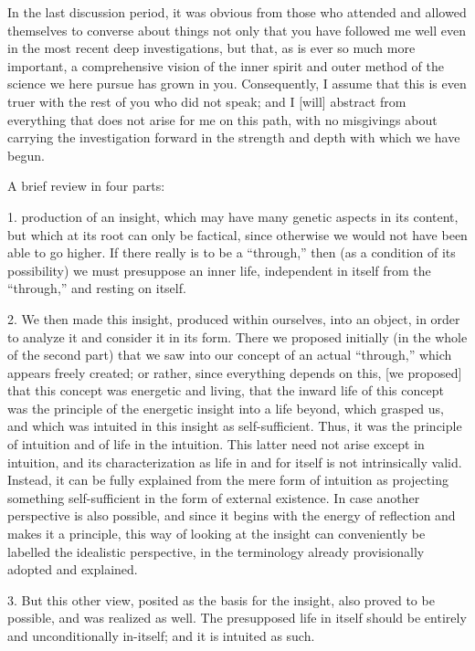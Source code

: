 In the last discussion period,
it was obvious from those who attended
and allowed themselves to converse about things
not only that you have followed me well
even in the most recent deep investigations,
but that, as is ever so much more important,
a comprehensive vision of the inner spirit
and outer method of the science
we here pursue has grown in you.
Consequently, I assume that this is
even truer with the rest of you who did not speak;
and I [will] abstract from everything
that does not arise for me on this path,
with no misgivings about carrying the investigation
forward in the strength and depth with which we have begun.

A brief review in four parts:

1. production of an insight,
which may have many genetic aspects in its content,
but which at its root can only be factical,
since otherwise we would not have been able to go higher.
If there really is to be a “through,”
then (as a condition of its possibility)
we must presuppose an inner life,
independent in itself from the “through,”
and resting on itself.

2. We then made this insight,
produced within ourselves,
into an object, in order to analyze it
and consider it in its form.
There we proposed initially (in the whole of the second part)
that we saw into our concept of an actual “through,”
which appears freely created;
or rather, since everything depends on this,
[we proposed] that this concept was energetic and living,
that the inward life of this concept was
the principle of the energetic insight into a life beyond,
which grasped us, and which was intuited
in this insight as self-sufficient.
Thus, it was the principle of intuition
and of life in the intuition.
This latter need not arise except in intuition,
and its characterization as life in and for itself
is not intrinsically valid.
Instead, it can be fully explained
from the mere form of intuition
as projecting something self-sufficient
in the form of external existence.
In case another perspective is also possible,
and since it begins with the energy of reflection
and makes it a principle,
this way of looking at the insight can conveniently
be labelled the idealistic perspective,
in the terminology already provisionally adopted and explained.

3. But this other view, posited as the basis for the insight,
also proved to be possible, and was realized as well.
The presupposed life in itself should be
entirely and unconditionally in-itself;
and it is intuited as such.

